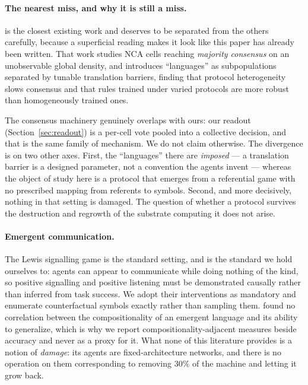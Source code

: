 \paragraph{The nearest miss, and why it is still a miss.}
\citet{singh2026communication} is the closest existing work and deserves to be
separated from the others carefully, because a superficial reading makes it look
like this paper has already been written. That work studies NCA cells reaching
\emph{majority consensus} on an unobservable global density, and introduces
``languages'' as subpopulations separated by tunable translation barriers,
finding that protocol heterogeneity slows consensus and that rules trained under
varied protocols are more robust than homogeneously trained ones.

The consensus machinery genuinely overlaps with ours: our readout
(Section~\ref{sec:readout}) is a per-cell vote pooled into a collective decision,
and that is the same family of mechanism. We do not claim otherwise. The
divergence is on two other axes. First, the ``languages'' there are
\emph{imposed} --- a translation barrier is a designed parameter, not a
convention the agents invent --- whereas the object of study here is a protocol
that emerges from a referential game with no prescribed mapping from referents to
symbols. Second, and more decisively, nothing in that setting is damaged. The
question of whether a protocol survives the destruction and regrowth of the
substrate computing it does not arise.

\paragraph{Emergent communication.}
The Lewis signalling game \citep{lewis1969convention} is the standard setting,
and \citet{lowe2019pitfalls} is the standard we hold ourselves to: agents can
appear to communicate while doing nothing of the kind, so positive signalling and
positive listening must be demonstrated causally rather than inferred from task
success. We adopt their interventions as mandatory and enumerate counterfactual
symbols exactly rather than sampling them.
\citet{chaabouni2020compositionality} found no correlation between the
compositionality of an emergent language and its ability to generalize, which is
why we report compositionality-adjacent measures beside accuracy and never as a
proxy for it. What none of this literature provides is a notion of \emph{damage}:
its agents are fixed-architecture networks, and there is no operation on them
corresponding to removing 30\% of the machine and letting it grow back.

